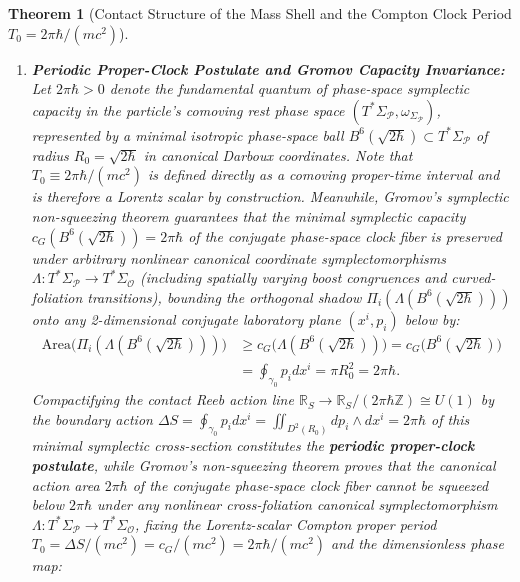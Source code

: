 \documentclass[11pt, a4paper]{article}
\newtheorem{theorem}{Theorem}[section]
\theoremstyle{definition}
\begin{document}
\begin{theorem}[Contact Structure of the Mass Shell and the Compton Clock Period $T_0 = 2\pi\hbar / (mc^2)$]
\begin{enumerate}[label=(\roman*)]
    \begin{equation}
    \label{eq:action_S}
    S(x^\mu) = -mc^2 \tau_{\text{proj}}(x^\mu), \qquad dS = s^*\alpha = -p_\mu dx^\mu = -mc^2 \alpha_{\text{clock}} = -mc^2 \beta_{\text{proper}}.
    \end{equation}
    \item \textbf{Periodic Proper-Clock Postulate and Gromov Capacity Invariance:} Let $2\pi\hbar > 0$ denote the fundamental quantum of phase-space symplectic capacity in the particle's comoving rest phase space $(T^*\Sigma_{\mathcal{P}}, \omega_{\Sigma_{\mathcal{P}}})$, represented by a minimal isotropic phase-space ball $B^6(\sqrt{2\hbar}) \subset T^*\Sigma_{\mathcal{P}}$ of radius $R_0 = \sqrt{2\hbar}$ in canonical Darboux coordinates. Note that $T_0 \equiv 2\pi\hbar / (mc^2)$ is defined directly as a comoving proper-time interval and is therefore a Lorentz scalar by construction. Meanwhile, Gromov's symplectic non-squeezing theorem \cite{Gromov1985} guarantees that the minimal symplectic capacity $c_G(B^6(\sqrt{2\hbar})) = 2\pi\hbar$ of the conjugate phase-space clock fiber is preserved under arbitrary nonlinear canonical coordinate symplectomorphisms $\Lambda: T^*\Sigma_{\mathcal{P}} \to T^*\Sigma_{\mathcal{O}}$ (including spatially varying boost congruences and curved-foliation transitions), bounding the orthogonal shadow $\Pi_i(\Lambda(B^6(\sqrt{2\hbar})))$ onto any 2-dimensional conjugate laboratory plane $(x^i, p_i)$ below by:
    \begin{equation}
    \label{eq:gromov_width}
    \begin{aligned}
    \text{Area}\big(\Pi_i(\Lambda(B^6(\sqrt{2\hbar})))\big) &\ge c_G\big(\Lambda(B^6(\sqrt{2\hbar}))\big) = c_G\big(B^6(\sqrt{2\hbar})\big) \\
    &= \oint_{\gamma_0} p_i dx^i = \pi R_0^2 = 2\pi \hbar.
    \end{aligned}
    \end{equation}
    Compactifying the contact Reeb action line $\mathbb{R}_S \to \mathbb{R}_S / (2\pi\hbar\mathbb{Z}) \cong U(1)$ by the boundary action $\Delta S = \oint_{\gamma_0} p_i dx^i = \iint_{D^2(R_0)} dp_i \wedge dx^i = 2\pi\hbar$ of this minimal symplectic cross-section constitutes the \textbf{periodic proper-clock postulate}, while Gromov's non-squeezing theorem proves that the canonical action area $2\pi\hbar$ of the conjugate phase-space clock fiber cannot be squeezed below $2\pi\hbar$ under any nonlinear cross-foliation canonical symplectomorphism $\Lambda: T^*\Sigma_{\mathcal{P}} \to T^*\Sigma_{\mathcal{O}}$, fixing the Lorentz-scalar Compton proper period $T_0 = \Delta S / (mc^2) = c_G / (mc^2) = 2\pi\hbar / (mc^2)$ and the dimensionless phase map:

\end{enumerate}
\end{theorem}
\end{document}
